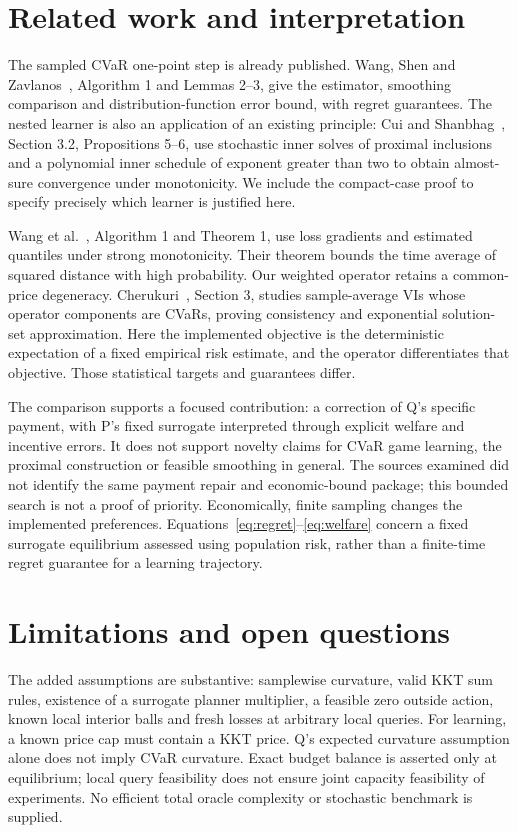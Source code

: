 \documentclass{article}
\begin{document}
\section{Related work and interpretation}
The sampled CVaR one-point step is already published. Wang, Shen and
Zavlanos~\cite{wang2022}, Algorithm 1 and Lemmas 2--3, give the estimator,
smoothing comparison and distribution-function error bound, with regret
guarantees. The nested learner is also an application of an existing
principle: Cui and Shanbhag~\cite{cui2021}, Section 3.2, Propositions 5--6,
use stochastic inner solves of proximal inclusions and a polynomial
inner schedule of exponent greater than two to obtain almost-sure
convergence under monotonicity. We include the compact-case proof to
specify precisely which learner is justified here.

Wang et al.~\cite{wang2024}, Algorithm 1 and Theorem 1, use loss gradients
and estimated quantiles under strong monotonicity. Their theorem bounds
the time average of squared distance with high probability. Our weighted
operator retains a common-price degeneracy. Cherukuri~\cite{cherukuri},
Section 3, studies sample-average VIs whose operator components are
CVaRs, proving consistency and exponential solution-set approximation.
Here the implemented objective is the deterministic expectation of a
fixed empirical risk estimate, and the operator differentiates that
objective. Those statistical targets and guarantees differ.

The comparison supports a focused contribution: a correction of Q's
specific payment, with P's fixed surrogate interpreted through explicit
welfare and incentive errors. It does not support novelty claims for
CVaR game learning, the proximal construction or feasible smoothing in
general. The sources examined did not identify the same payment repair
and economic-bound package; this bounded search is not a proof of priority.
Economically, finite sampling changes the implemented preferences.
Equations~\eqref{eq:regret}--\eqref{eq:welfare} concern a fixed surrogate
equilibrium assessed using population risk, rather than a finite-time
regret guarantee for a learning trajectory.

\section{Limitations and open questions}
The added assumptions are substantive: samplewise curvature, valid KKT
sum rules, existence of a surrogate planner multiplier, a feasible zero
outside action, known local interior balls and fresh losses at arbitrary
local queries. For learning, a known price cap must contain a KKT
price. Q's expected curvature assumption alone does not imply CVaR
curvature. Exact budget balance is asserted only at equilibrium; local
query feasibility does not ensure joint capacity feasibility of experiments.
No efficient total oracle complexity or stochastic benchmark is supplied.
\end{document}
